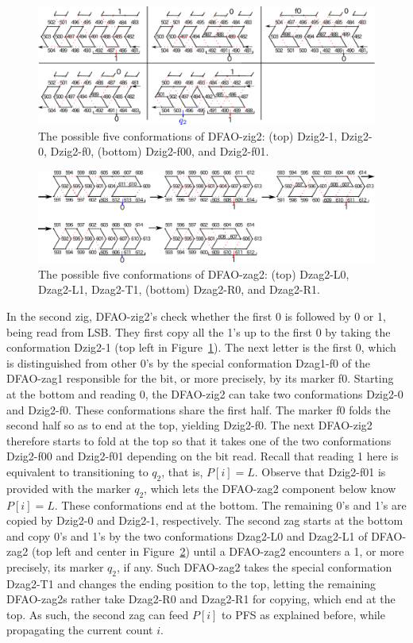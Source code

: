 \begin{figure}[h]
\centering
\includegraphics[width=\linewidth]{pic/Dzig2.pdf}
  \caption{The possible five conformations of DFAO-zig2: (top) Dzig2-1, Dzig2-0, Dzig2-f0, (bottom) Dzig2-f00, and Dzig2-f01. }
  \label{fig:DFAO-zig2}
\end{figure} 

\begin{figure}[h]
\centering
\includegraphics[width=\linewidth]{pic/Dzag2.pdf}
  \caption{The possible five conformations of DFAO-zag2: (top) Dzag2-L0, Dzag2-L1, Dzag2-T1, (bottom) Dzag2-R0, and Dzag2-R1.}
  \label{fig:DFAO-zag2}
  \end{figure} 

In the second zig, DFAO-zig2's check whether the first 0 is followed by 0 or 1, being read from LSB.
They first copy all the 1's up to the first 0 by taking the conformation Dzig2-1 (top left in Figure~\ref{fig:DFAO-zig2}).
The next letter is the first 0, which is distinguished from other 0's by the special conformation Dzag1-f0 of the DFAO-zag1 responsible for the bit, or more precisely, by its marker f0. 
Starting at the bottom and reading 0, the DFAO-zig2 can take two conformations Dzig2-0 and Dzig2-f0.
These conformations share the first half.
The marker f0 folds the second half so as to end at the top, yielding Dzig2-f0. 
The next DFAO-zig2 therefore starts to fold at the top so that it takes one of the two conformations Dzig2-f00 and Dzig2-f01 depending on the bit read.
Recall that reading 1 here is equivalent to transitioning to $q_2$, that is, $P[i] = L$.
Observe that Dzig2-f01 is provided with the marker $q_2$, which lets the DFAO-zag2 component below know $P[i] = L$. 
These conformations end at the bottom.
The remaining 0's and 1's are copied by Dzig2-0 and Dzig2-1, respectively.
The second zag starts at the bottom and copy 0's and 1's by the two conformations Dzag2-L0 and Dzag2-L1 of DFAO-zag2 (top left and center in Figure~\ref{fig:DFAO-zag2}) until a DFAO-zag2 encounters a 1, or more precisely, its marker $q_2$, if any. 
Such DFAO-zag2 takes the special conformation Dzag2-T1 and changes the ending position to the top, letting the remaining DFAO-zag2s rather take Dzag2-R0 and Dzag2-R1 for copying, which end at the top.
As such, the second zag can feed $P[i]$ to PFS as explained before, while propagating the current count $i$.


